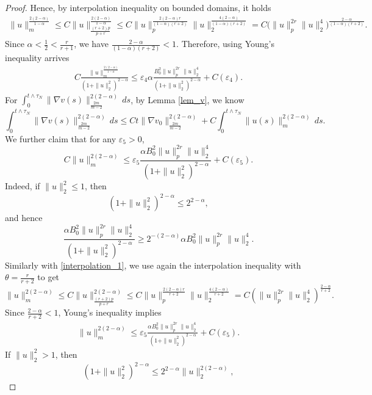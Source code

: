 \documentclass[reqno, 11pt]{amsart}
\theoremstyle{definition}
\numberwithin{equation}{section} \numberwithin{lem}{section}
\numberwithin{thm}{section} \numberwithin{prop}{section}
\numberwithin{cor}{section} \numberwithin{rem}{section}
\numberwithin{defn}{section}
\begin{document}
\begin{proof}
	Hence, by interpolation inequality on bounded domains, it holds 
	\begin{align}\label{interpolation_1}
	    \|u\|_m^{\frac{2(2-\alpha)}{1-\alpha}}\le C\|u\|_{\frac{(r+2)p}{p+r}}^{\frac{2(2-\alpha)}{1-\alpha}}
	\le
	C\|u\|_p^{\frac{2(2-\alpha)r}{(1-\alpha)(r+2)}}
	\|u\|_2^{\frac{4(2-\alpha)}{(1-\alpha)(r+2)}}
	=
	C\big(\|u\|_p^{2r}\|u\|_2^4\big)^{\frac{2-\alpha}{(1-\alpha)(r+2)}}.
	\end{align}
	Since $\alpha<\frac{1}{2}<\frac{r}{r+1}$, we have $\frac{2-\alpha}{(1-\alpha)(r+2)}<1.$
	Therefore, using Young's inequality arrives
	\begin{align}
		\label{u_m_a}
		C\frac{\|u\|_m^{\frac{2(2-\alpha)}{1-\alpha}}}{(1+\|u\|_2^2)^{2-\alpha}}
		\le
		\varepsilon_4 \alpha\frac{{B_0^2}\|u\|_p^{2r}\|u\|_2^4}{(1+\|u\|_2^2)^{2-\alpha}}
		+C(\varepsilon_4).
	\end{align}
	For $\int_0^{t\wedge{\tau_N}}\|\nabla v(s)\|_{\frac{2m}{m-2}}^{2(2-\alpha)}\,ds$,  by Lemma \ref{lem_v}, we know 
	\begin{equation}
		\int_0^{t\wedge{\tau_N}}\|\nabla v(s)\|_{\frac{2m}{m-2}}^{2(2-\alpha)}\,ds
		\le
		Ct\|\nabla v_0\|_{\frac{2m}{m-2}}^{2(2-\alpha)}+C\int_0^{t\wedge{\tau_N}}\|u(s)\|_m^{2(2-\alpha)}\,ds.
	\end{equation}
	We further claim that for any $\varepsilon_5>0$,
	\begin{equation}
		\label{ine_u,m}
C\|u\|_m^{2(2-\alpha)}
\le\varepsilon_5
		\frac{\alpha{B_0^2}\|u\|_p^{2r}\|u\|_2^4}{(1+\|u\|_2^2)^{2-\alpha}}
		+
		C(\varepsilon_5).
	\end{equation}
    Indeed, if  $\|u\|_2^2\le 1$,
	then
	\[
	(1+\|u\|_2^2)^{2-\alpha}\le 2^{2-\alpha},
	\]
	and hence
	\[
	\frac{\alpha{B_0^2}\|u\|_p^{2r}\|u\|_2^4}{(1+\|u\|_2^2)^{2-\alpha}}
	\ge
	2^{-(2-\alpha)}\alpha{B_0^2}\|u\|_p^{2r}\|u\|_2^4.
	\]
	Similarly with \eqref{interpolation_1}, we use again the interpolation inequality with $\theta=\frac{r}{r+2}$ to get
	\[
	\|u\|_m^{2(2-\alpha)}
	\le C\|u\|_{\frac{(r+2)p}{p+r}}^{2(2-\alpha)}\le
	C\|u\|_p^{\frac{2(2-\alpha)r}{r+2}}
	\|u\|_2^{\frac{4(2-\alpha)}{r+2}}
	=
	C(\|u\|_p^{2r}\|u\|_2^4)^{\frac{2-\alpha}{r+2}}.
	\]
	Since $\frac{2-\alpha}{r+2}<1$, Young's inequality implies
	\begin{align}
	    \|u\|_m^{2(2-\alpha)}
	\le
	\varepsilon_5\frac{\alpha{B_0^2}\|u\|_p^{2r}\|u\|_2^4}{(1+\|u\|_2^2)^{2-\alpha}}
	+
	C(\varepsilon_5).
	\end{align}
	 If $\|u\|_2^2>1$, then
	\[
	(1+\|u\|_2^2)^{2-\alpha}\le 2^{2-\alpha}\|u\|_2^{2(2-\alpha)},
\]
\end{proof}
\end{document}
